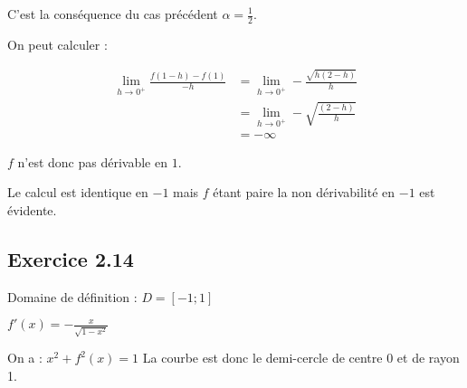\documentclass{report}
\begin{document}
C'est la conséquence du cas précédent $\alpha = \frac{1}{2}$.

On peut calculer :

\begin{equation*}
	\begin{split}
		\lim_{h \rightarrow 0^{+}} \frac{f(1-h) - f(1)}{-h}
			&= \lim_{h \rightarrow 0^{+}} -\frac{\sqrt{h(2-h)}}{h} \\
			&= \lim_{h \rightarrow 0^{+}} -\sqrt{\frac{(2-h)}{h}} \\
			&= -\infty
	\end{split}
\end{equation*}

$f$ n'est donc pas dérivable en $1$.

Le calcul est identique en $-1$ mais $f$ étant paire la non dérivabilité en $-1$ est évidente.


\subsection*{Exercice 2.14}

Domaine de définition : $D = [-1 ; 1]$

$f'(x) = -\frac{x}{\sqrt{1-x^2}}$



On a : $x^2 + f^2(x) = 1$
La courbe est donc le demi-cercle de centre 0 et de rayon 1.
\end{document}
